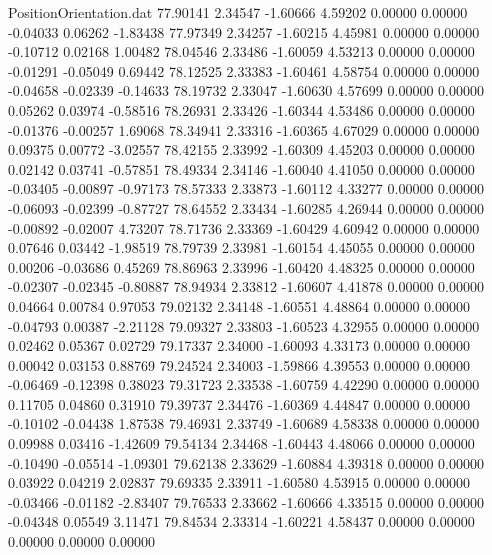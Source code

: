\begin{filecontents}{PositionOrientation.dat}
  77.90141    2.34547   -1.60666     4.59202    0.00000    0.00000   -0.04033    0.06262   -1.83438
  77.97349    2.34257   -1.60215     4.45981    0.00000    0.00000   -0.10712    0.02168    1.00482
  78.04546    2.33486   -1.60059     4.53213    0.00000    0.00000   -0.01291   -0.05049    0.69442
  78.12525    2.33383   -1.60461     4.58754    0.00000    0.00000   -0.04658   -0.02339   -0.14633
  78.19732    2.33047   -1.60630     4.57699    0.00000    0.00000    0.05262    0.03974   -0.58516
  78.26931    2.33426   -1.60344     4.53486    0.00000    0.00000   -0.01376   -0.00257    1.69068
  78.34941    2.33316   -1.60365     4.67029    0.00000    0.00000    0.09375    0.00772   -3.02557
  78.42155    2.33992   -1.60309     4.45203    0.00000    0.00000    0.02142    0.03741   -0.57851
  78.49334    2.34146   -1.60040     4.41050    0.00000    0.00000   -0.03405   -0.00897   -0.97173
  78.57333    2.33873   -1.60112     4.33277    0.00000    0.00000   -0.06093   -0.02399   -0.87727
  78.64552    2.33434   -1.60285     4.26944    0.00000    0.00000   -0.00892   -0.02007    4.73207
  78.71736    2.33369   -1.60429     4.60942    0.00000    0.00000    0.07646    0.03442   -1.98519
  78.79739    2.33981   -1.60154     4.45055    0.00000    0.00000    0.00206   -0.03686    0.45269
  78.86963    2.33996   -1.60420     4.48325    0.00000    0.00000   -0.02307   -0.02345   -0.80887
  78.94934    2.33812   -1.60607     4.41878    0.00000    0.00000    0.04664    0.00784    0.97053
  79.02132    2.34148   -1.60551     4.48864    0.00000    0.00000   -0.04793    0.00387   -2.21128
  79.09327    2.33803   -1.60523     4.32955    0.00000    0.00000    0.02462    0.05367    0.02729
  79.17337    2.34000   -1.60093     4.33173    0.00000    0.00000    0.00042    0.03153    0.88769
  79.24524    2.34003   -1.59866     4.39553    0.00000    0.00000   -0.06469   -0.12398    0.38023
  79.31723    2.33538   -1.60759     4.42290    0.00000    0.00000    0.11705    0.04860    0.31910
  79.39737    2.34476   -1.60369     4.44847    0.00000    0.00000   -0.10102   -0.04438    1.87538
  79.46931    2.33749   -1.60689     4.58338    0.00000    0.00000    0.09988    0.03416   -1.42609
  79.54134    2.34468   -1.60443     4.48066    0.00000    0.00000   -0.10490   -0.05514   -1.09301
  79.62138    2.33629   -1.60884     4.39318    0.00000    0.00000    0.03922    0.04219    2.02837
  79.69335    2.33911   -1.60580     4.53915    0.00000    0.00000   -0.03466   -0.01182   -2.83407
  79.76533    2.33662   -1.60666     4.33515    0.00000    0.00000   -0.04348    0.05549    3.11471
  79.84534    2.33314   -1.60221     4.58437    0.00000    0.00000    0.00000    0.00000    0.00000
\end{filecontents}
